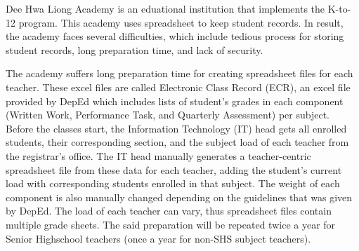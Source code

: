 \documentclass[11pt,a4paper,titlepage]{article}
\begin{document}




Dee Hwa Liong Academy is an eduational institution that implements the K-to-12 program. This academy uses spreadsheet to keep student records. In result, the academy faces several difficulties, which include tedious process for storing student records, long preparation time, and lack of security.

The academy suffers long preparation time for creating spreadsheet files for each teacher. These excel files are called Electronic Class Record (ECR), an excel file provided by DepEd which includes lists of student's grades in each component (Written Work, Performance Task, and Quarterly Assessment) per subject. Before the classes start, the Information Technology (IT) head gets all enrolled students, their corresponding section, and the subject load of each teacher from the registrar's office. The IT head manually generates a teacher-centric spreadsheet file from these data for each teacher, adding the student's current load with corresponding students enrolled in that subject. The weight of each component is also manually changed depending on the guidelines that was given by DepEd. The load of each teacher can vary, thus spreadsheet files contain multiple grade sheets. The said preparation will be repeated twice a year for Senior Highschool teachers (once a year for non-SHS subject teachers).
\end{document}

